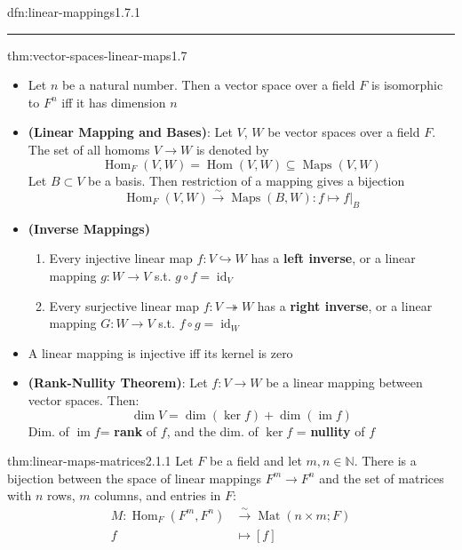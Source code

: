 \documentclass[landscape, 8pt]{extarticle}
\DeclareMathOperator{\im}{im}
\DeclareMathOperator{\Maps}{Maps}
\DeclareMathOperator{\Mat}{Mat}
\DeclareMathOperator{\Hom}{Hom}
\DeclareMathOperator{\id}{id}
\begin{document}
\begin{multicols}{3}
\begin{dfn}{dfn:linear-mappings}{1.7.1}
    \noindent\rule{\textwidth}{0.2pt}

\end{dfn}

\begin{thm}{thm:vector-spaces-linear-maps}{1.7}
    \begin{itemize}
        \setlength\itemsep{0em}
        \item[\textbf{1.7.7}] Let $n$ be a natural number. Then a vector space over a field $F$ is isomorphic to $F^{n}$ iff it has dimension $n$
        \item[\textbf{1.7.8}] \textbf{(Linear Mapping and Bases)}: Let $V$, $W$ be vector spaces over a field $F$. The set of all homoms $V\to W$ is denoted by
        \[\Hom_{F}(V,W) = \Hom(V,W)\subseteq \Maps(V,W)\]
        Let $B \subset V$ be a basis. Then restriction of a mapping gives a bijection
            \[\Hom_{F}(V, W) \xrightarrow{\sim} \Maps(B, W) :
            f \mapsto f \lvert_{B}\]


        \item[\textbf{1.7.9}:] \textbf{(Inverse Mappings)}
            \begin{enumerate}[leftmargin=*]
                \setlength\itemsep{0em}
                \item Every injective linear map $f : V \hookrightarrow W$ has a \textbf{left inverse}, or a linear mapping $g : W \to V$ s.t. $g \circ f = \id_{V}$
                \item Every surjective linear map $f : V \twoheadrightarrow W$ has a \textbf{right inverse}, or a linear mapping $G : W \to V$ s.t. $f \circ g = \id_{W}$
            \end{enumerate}
        \item[\textbf{1.8.2}] A linear mapping is injective iff its kernel is zero
        \item[\textbf{1.8.4}] \textbf{(Rank-Nullity Theorem)}: Let $f : V \to W$ be a linear mapping between vector spaces. Then:
        \[\dim V = \dim(\ker f) + \dim (\im f)\]
        Dim. of $\im f$= \textbf{rank} of $f$, and the dim. of $\ker f$ = \textbf{nullity} of $f$
    \end{itemize}
\end{thm}



\begin{thm}{thm:linear-maps-matrices}{2.1.1}
    Let $F$ be a field and let $m,n\in \mathbb{N}$. There is a bijection between the space of linear mappings $F^{m}\to F^{n}$ and the set of matrices with $n$ rows, $m$ columns, and entries in $F$:
    \begin{align*}
        M : \Hom_{F}(F^{m}, F^{n}) &\xrightarrow{\sim} \Mat(n \times m; F)\\
        f &\mapsto [f]
    \end{align*}


\end{thm}
\end{multicols}
\end{document}
